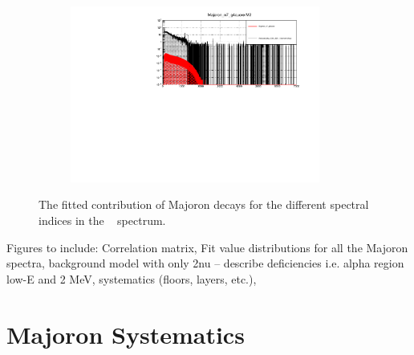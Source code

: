 \begin{figure}[htbp]
\begin{subfigure}[t]{0.49\linewidth}
\end{subfigure}
\qquad
\begin{subfigure}[t]{0.49\linewidth}
\includegraphics[width=0.9\textwidth]{Figures/Majoron_n7_g4cuore_M2.pdf}
\end{subfigure}
\caption[The fitted contribution of Majoron decays for the different spectral indices in the \Mtwo~ spectrum.]{The fitted contribution of Majoron decays for the different spectral indices in the \Mtwo~ spectrum.}
\label{fig:SpectralIndicesM2Fit}
\end{figure}

Figures to include: Correlation matrix, Fit value distributions for all the Majoron spectra, background model with only 2nu -- describe deficiencies i.e. alpha region low-E and 2 MeV, systematics (floors, layers, etc.), 

\section{Majoron Systematics}